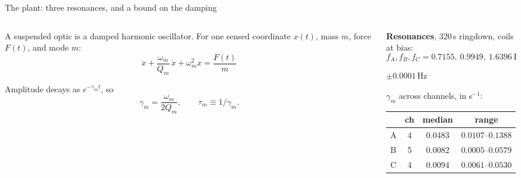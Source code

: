 \documentclass[aspectratio=169]{beamer}
\begin{document}
\begin{frame}{The plant: three resonances, and a bound on the damping}
  \begin{columns}[T]
    \begin{column}{0.47\textwidth}
      \footnotesize
      A suspended optic is a damped harmonic oscillator. For one sensed
      coordinate $x(t)$, mass $m$, force $F(t)$, and mode $m$:
      \[ \ddot{x} + \frac{\omega_m}{Q_m}\,\dot{x} + \omega_m^2 x = \frac{F(t)}{m} \]
      \vspace{-3mm}

      Amplitude decays as $e^{-\gamma_m t}$, so
      \[ \gamma_m = \frac{\omega_m}{2 Q_m}, \qquad \tau_m \equiv 1/\gamma_m. \]

    \end{column}
    \begin{column}{0.51\textwidth}
      \textbf{Resonances}, 320\,s ringdown, coils at bias:
      \[ f_A, f_B, f_C = 0.7155,\ 0.9949,\ 1.6396\ \mathrm{Hz} \]
      \vspace{1mm}
      \begin{center}$\pm 0.0001$\,Hz\end{center}
      \footnotesize\raggedright
      $\gamma_m$ across channels, in s$^{-1}$:

      \vspace{1mm}
      \centering
      {\scriptsize
      \begin{tabular}{@{}lccc@{}}
        \toprule
        & ch & median & range \\
        \midrule
        A & 4 & 0.0483 & $0.0107$--$0.1388$ \\
        B & 5 & 0.0082 & $0.0005$--$0.0579$ \\
        C & 4 & 0.0094 & $0.0061$--$0.0530$ \\
        \bottomrule
      \end{tabular}}
      \end{column}
  \end{columns}
\end{frame}
\end{document}
